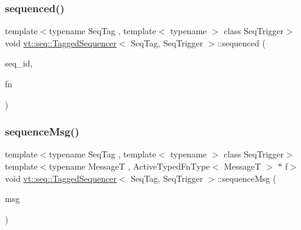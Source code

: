 \mbox{\label{structvt_1_1seq_1_1_tagged_sequencer_ade6a701fdb88aadfb792fb5a5f4ecb3b}} 
\subsubsection{\texorpdfstring{sequenced()}{sequenced()}\hspace{0.1cm}{\footnotesize\ttfamily [3/3]}}
{\footnotesize\ttfamily template$<$typename Seq\+Tag , template$<$ typename $>$ class Seq\+Trigger$>$ \\
void \hyperlink{structvt_1_1seq_1_1_tagged_sequencer}{vt\+::seq\+::\+Tagged\+Sequencer}$<$ Seq\+Tag, Seq\+Trigger $>$\+::sequenced (\begin{DoxyParamCaption}\item[{\hyperlink{structvt_1_1seq_1_1_tagged_sequencer_a1c8ee839258d0f88c49ef660267a81d5}{Seq\+Type} const \&}]{seq\+\_\+id,  }\item[{\hyperlink{namespacevt_1_1seq_a26c632e5cbf02395a8bbd9aa4c761232}{Func\+Type} const \&}]{fn }\end{DoxyParamCaption})}

\mbox{\label{structvt_1_1seq_1_1_tagged_sequencer_a51470994cb625a098a7ebb9ccc489ec7}} 
\subsubsection{\texorpdfstring{sequence\+Msg()}{sequenceMsg()}}
{\footnotesize\ttfamily template$<$typename Seq\+Tag , template$<$ typename $>$ class Seq\+Trigger$>$ \\
template$<$typename MessageT , Active\+Typed\+Fn\+Type$<$ Message\+T $>$ $\ast$ f$>$ \\
void \hyperlink{structvt_1_1seq_1_1_tagged_sequencer}{vt\+::seq\+::\+Tagged\+Sequencer}$<$ Seq\+Tag, Seq\+Trigger $>$\+::sequence\+Msg (\begin{DoxyParamCaption}\item[{MessageT $\ast$}]{msg }\end{DoxyParamCaption})}


